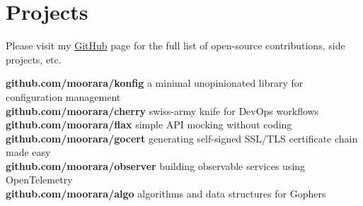 \documentclass[]{cv-style}                     %
\begin{document}
\section{Projects}

Please visit my \href{http://github.com/moorara}{GitHub} page for the full list of open-source contributions, side projects, etc.

\textbf{github.com/moorara/konfig} a minimal unopinionated library for configuration management  \\
\textbf{github.com/moorara/cherry} swiss-army knife for DevOps workflows  \\
\textbf{github.com/moorara/flax} simple API mocking without coding  \\
\textbf{github.com/moorara/gocert} generating self-signed SSL/TLS certificate chain made easy \\
\textbf{github.com/moorara/observer} building observable services using OpenTelemetry \\
\textbf{github.com/moorara/algo} algorithms and data structures for Gophers \\

\begin{entrylist}



\end{entrylist}



\end{document}
